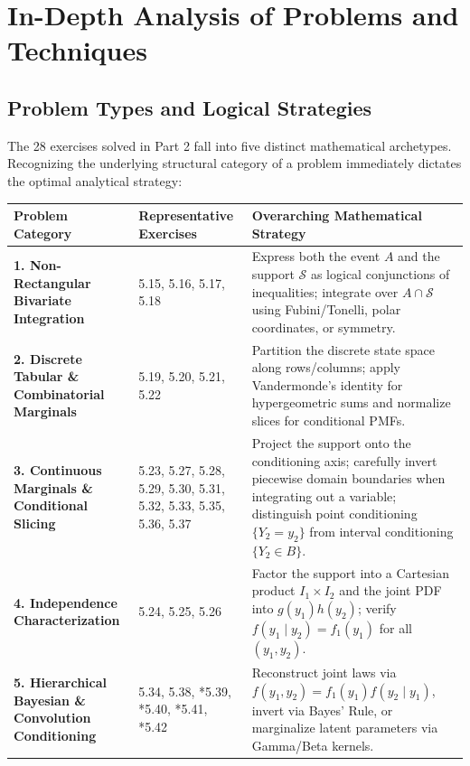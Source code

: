 \documentclass[11pt, letterpaper]{article}
\theoremstyle{definition}
\theoremstyle{remark}
\begin{document}
\newpage
\section{In-Depth Analysis of Problems and Techniques}

\subsection{Problem Types and Logical Strategies}

The 28 exercises solved in Part 2 fall into five distinct mathematical archetypes. Recognizing the underlying structural category of a problem immediately dictates the optimal analytical strategy:

\renewcommand{\arraystretch}{1.5}
\begin{tabularx}{\textwidth}{>{\bfseries}l X X}
\toprule
Problem Category & Representative Exercises & Overarching Mathematical Strategy \\
\midrule
1. Non-Rectangular Bivariate Integration & 5.15, 5.16, 5.17, 5.18 & Express both the event $A$ and the support $\mathcal{S}$ as logical conjunctions of inequalities; integrate over $A \cap \mathcal{S}$ using Fubini/Tonelli, polar coordinates, or symmetry. \\
2. Discrete Tabular \& Combinatorial Marginals & 5.19, 5.20, 5.21, 5.22 & Partition the discrete state space along rows/columns; apply Vandermonde's identity for hypergeometric sums and normalize slices for conditional PMFs. \\
3. Continuous Marginals \& Conditional Slicing & 5.23, 5.27, 5.28, 5.29, 5.30, 5.31, 5.32, 5.33, 5.35, 5.36, 5.37 & Project the support onto the conditioning axis; carefully invert piecewise domain boundaries when integrating out a variable; distinguish point conditioning $\{Y_2 = y_2\}$ from interval conditioning $\{Y_2 \in B\}$. \\
4. Independence Characterization & 5.24, 5.25, 5.26 & Factor the support into a Cartesian product $I_1 \times I_2$ and the joint PDF into $g(y_1)h(y_2)$; verify $f(y_1 \mid y_2) = f_1(y_1)$ for all $(y_1, y_2)$. \\
5. Hierarchical Bayesian \& Convolution Conditioning & 5.34, 5.38, *5.39, *5.40, *5.41, *5.42 & Reconstruct joint laws via $f(y_1, y_2) = f_1(y_1)f(y_2 \mid y_1)$, invert via Bayes' Rule, or marginalize latent parameters via Gamma/Beta kernels. \\
\bottomrule
\end{tabularx}
\end{document}

